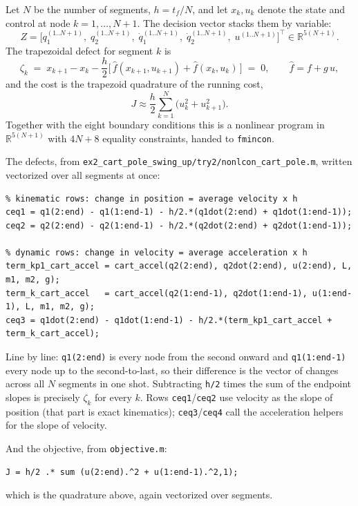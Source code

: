 \documentclass[11pt]{article}
\newcommand{\file}[1]{\texttt{#1}}
\newcommand{\R}{\mathbb{R}}
\newcommand{\tf}{t_f}
\begin{document}
\begin{rig}
Let $N$ be the number of segments, $h=\tf/N$, and let $x_k, u_k$ denote the
state and control at node $k=1,\dots,N+1$. The decision vector stacks them by
variable:
\[
Z=\bigl[q_1^{(1..N+1)},\;q_2^{(1..N+1)},\;\dot q_1^{(1..N+1)},\;\dot q_2^{(1..N+1)},\;u^{(1..N+1)}\bigr]^\top\in\R^{5(N+1)} .
\]
The trapezoidal defect for segment $k$ is
\[
\zeta_k \;=\; x_{k+1}-x_k-\frac{h}{2}\bigl[\,\hat f(x_{k+1},u_{k+1})+\hat f(x_k,u_k)\,\bigr] \;=\;0,
\qquad \hat f = f+g\,u,
\]
and the cost is the trapezoid quadrature of the running cost,
\[
J\approx\frac{h}{2}\sum_{k=1}^{N}\bigl(u_k^2+u_{k+1}^2\bigr).
\]
Together with the eight boundary conditions this is a nonlinear program in
$\R^{5(N+1)}$ with $4N+8$ equality constraints, handed to \texttt{fmincon}.

The defects, from \file{ex2\_cart\_pole\_swing\_up/try2/nonlcon\_cart\_pole.m},
written vectorized over all segments at once:

\begin{lstlisting}
% kinematic rows: change in position = average velocity x h
ceq1 = q1(2:end) - q1(1:end-1) - h/2.*(q1dot(2:end) + q1dot(1:end-1));
ceq2 = q2(2:end) - q2(1:end-1) - h/2.*(q2dot(2:end) + q2dot(1:end-1));

% dynamic rows: change in velocity = average acceleration x h
term_kp1_cart_accel = cart_accel(q2(2:end), q2dot(2:end), u(2:end), L, m1, m2, g);
term_k_cart_accel   = cart_accel(q2(1:end-1), q2dot(1:end-1), u(1:end-1), L, m1, m2, g);
ceq3 = q1dot(2:end) - q1dot(1:end-1) - h/2.*(term_kp1_cart_accel + term_k_cart_accel);
\end{lstlisting}

Line by line: \texttt{q1(2:end)} is every node from the second onward and
\texttt{q1(1:end-1)} every node up to the second-to-last, so their difference is
the vector of changes across all $N$ segments in one shot. Subtracting
\texttt{h/2} times the sum of the endpoint slopes is precisely $\zeta_k$ for
every $k$. Rows \texttt{ceq1}/\texttt{ceq2} use velocity as the slope of
position (that part is exact kinematics); \texttt{ceq3}/\texttt{ceq4} call the
acceleration helpers for the slope of velocity.

And the objective, from \file{objective.m}:

\begin{lstlisting}
J = h/2 .* sum (u(2:end).^2 + u(1:end-1).^2,1);
\end{lstlisting}

which is the quadrature above, again vectorized over segments.
\end{rig}
\end{document}
